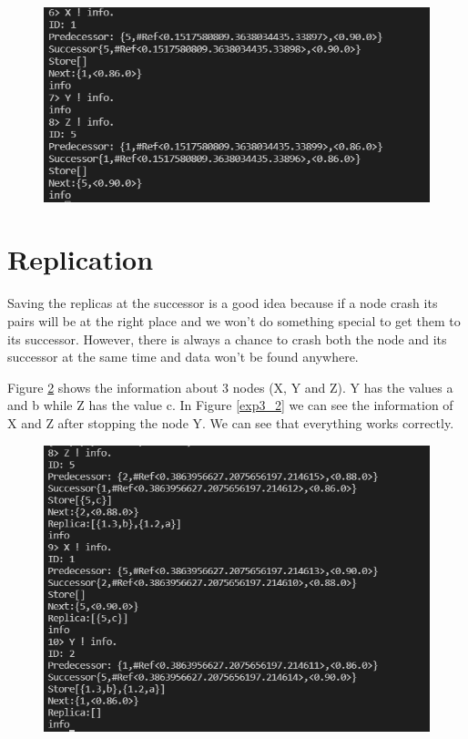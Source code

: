 \documentclass[a4paper, 11pt]{article}
\begin{document}
\begin{figure}
  \begin{center}
    \includegraphics[scale=0.4]{exp2_2.PNG}
    \caption{}
    \label{exp2_2}
  \end{center}
\end{figure}

\section{Replication}
Saving the replicas at the successor is a good idea because if a node crash its pairs will be at the right place and we won't do something special to get them to its successor. However, there is always a chance to crash both the node and its successor at the same time and data won't be found anywhere.

Figure \ref{exp3_1} shows the information about 3 nodes (X, Y and Z). Y has the values a and b while Z has the value c. In Figure \ref{exp3_2} we can see the information of X and Z after stopping the node Y. We can see that everything works correctly.
\begin{figure}
  \begin{center}
    \includegraphics[scale=0.4]{exp3_1.PNG}
    \caption{}
    \label{exp3_1}
  \end{center}
\end{figure}
\end{document}
